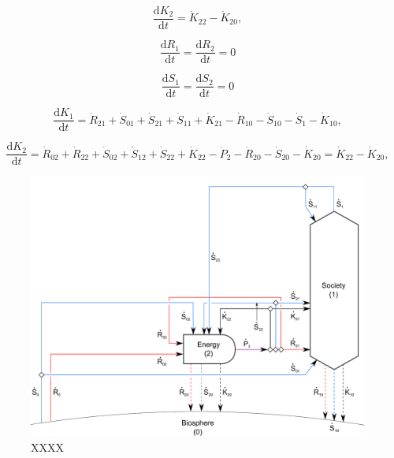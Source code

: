 \begin{equation} \label{eq:CV_K_dot_2}
	\frac{\mathrm{d}K_{2}}{\mathrm{d}t}
	=  \dot{K}_{22} - \dot{K}_{20},
\end{equation}

\begin{equation}\label{eq:dR_dt_zero}
	\frac{\mathrm{d}R_{1}}{\mathrm{d}t} = \frac{\mathrm{d}R_{2}}{\mathrm{d}t} = 0
\end{equation}

\begin{equation}\label{eq:dS_dt_zero}
	\frac{\mathrm{d}S_{1}}{\mathrm{d}t} = \frac{\mathrm{d}S_{2}}{\mathrm{d}t} = 0
\end{equation}

\begin{equation} \label{eq:CV_R_dot_1b}
	\frac{\mathrm{d}K_{1}}{\mathrm{d}t}
	=  \dot{R}_{21} 
	+ \dot{S}_{01} + \dot{S}_{21} + \dot{S}_{11}
	+ \dot{K}_{21} 
	- \dot{R}_{10} 
	- \dot{S}_{10} - \dot{S}_{1}
	- \dot{K}_{10},
\end{equation}

\begin{equation} \label{eq:CV_R_dot_2b}
	\frac{\mathrm{d}K_{2}}{\mathrm{d}t}
	=  \dot{R}_{02} + \dot{R}_{22} 
	+ \dot{S}_{02} + \dot{S}_{12} + \dot{S}_{22} 
	+ \dot{K}_{22}
	- \dot{P}_{2}
	- \dot{R}_{20} 
	- \dot{S}_{20} 
	- \dot{K}_{20}
	= \dot{K}_{22} - \dot{K}_{20},
\end{equation}

\begin{figure}[h!]
\centering
\includegraphics[width=0.8\linewidth]{Part_1/Chapter_Materials/images/2_sector_materials.pdf}
\caption{XXXX}
\label{fig:B_materials}
\end{figure}

